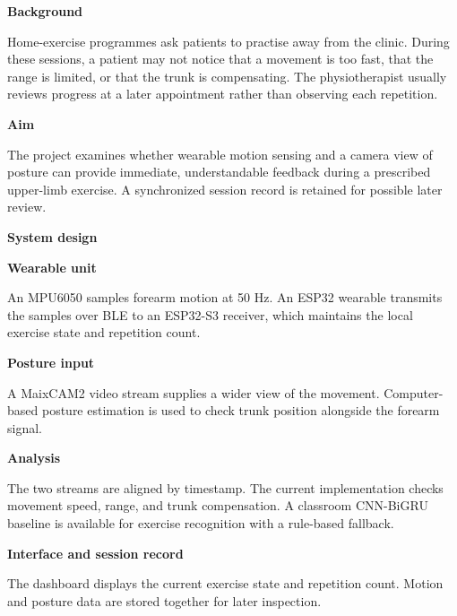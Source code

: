 \documentclass[10pt,a4paper]{article}
\newcommand{\sectionhead}[1]{%
  {\bfseries\color{ReportNavy}\fontsize{13.0}{14.4}\selectfont #1\par}%
  \vspace{1.8mm}%
}
\newcommand{\subhead}[1]{%
  {\bfseries\color{ReportNavy}\fontsize{10.2}{11.4}\selectfont #1\par}%
}
\begin{document}
\begin{minipage}[t]{0.477\linewidth}
  \vspace{0pt}\raggedright

  \sectionhead{Background}
  Home-exercise programmes ask patients to practise away from the clinic.
  During these sessions, a patient may not notice that a movement is too fast,
  that the range is limited, or that the trunk is compensating. The
  physiotherapist usually reviews progress at a later appointment rather than
  observing each repetition.

  \vspace{6.5mm}
  \sectionhead{Aim}
  The project examines whether wearable motion sensing and a camera view of
  posture can provide immediate, understandable feedback during a prescribed
  upper-limb exercise. A synchronized session record is retained for possible
  later review.

  \vspace{6.5mm}
  \sectionhead{System design}

  \subhead{Wearable unit}
  \vspace{0.8mm}
  An MPU6050 samples forearm motion at 50 Hz. An ESP32 wearable transmits the
  samples over BLE to an ESP32-S3 receiver, which maintains the local exercise
  state and repetition count.

  \vspace{4.2mm}
  \subhead{Posture input}
  \vspace{0.8mm}
  A MaixCAM2 video stream supplies a wider view of the movement. Computer-based
  posture estimation is used to check trunk position alongside the forearm
  signal.

  \vspace{4.2mm}
  \subhead{Analysis}
  \vspace{0.8mm}
  The two streams are aligned by timestamp. The current implementation checks
  movement speed, range, and trunk compensation. A classroom CNN-BiGRU
  baseline is available for exercise recognition with a rule-based fallback.

  \vspace{4.2mm}
  \subhead{Interface and session record}
  \vspace{0.8mm}
  The dashboard displays the current exercise state and repetition count.
  Motion and posture data are stored together for later inspection.

\end{minipage}
\hfill
\end{document}
